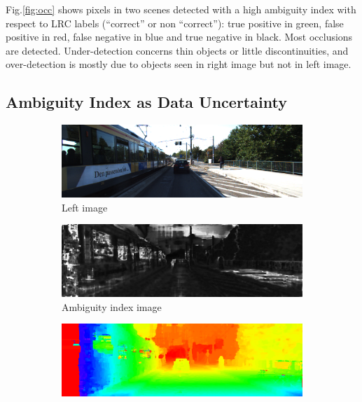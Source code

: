 \documentclass{article}
\begin{document}
Fig.\ref{fig:occ} shows pixels in two scenes detected with a high ambiguity index with respect to LRC labels (``correct'' or non ``correct''): true positive in green, false positive in red, false negative in blue and true negative in black. Most occlusions are detected. Under-detection concerns thin objects or little discontinuities, and over-detection is mostly due to objects seen in right image but not in left image.

\subsection{Ambiguity Index as Data Uncertainty}

\begin{figure}[ht]
\centering
        \begin{subfigure}[t]{0.98\linewidth}
                \includegraphics[width=0.99\linewidth]{Figures/144_10_il}
                \caption{Left image}
        \end{subfigure}
        \begin{subfigure}[t]{0.98\linewidth}
                \includegraphics[width=0.99\linewidth]{Figures/144_10_ml2}
                \caption{Ambiguity index image}
        \end{subfigure}
        \begin{subfigure}[t]{0.98\linewidth}
                \includegraphics[width=0.99\linewidth]{Figures/144_10_df}

\end{subfigure}
\end{figure}
\end{document}
